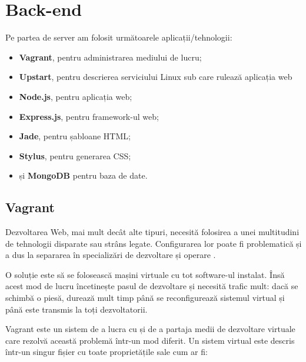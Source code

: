 \documentclass[a4wide,12pt]{report}
\newcommand{\eng}[1]{{#1}} %
\newcommand{\acr}[1]{{\textsmaller[1]{\textsc{#1}}}} %
\begin{document}
\section{\eng{Back-end}}

Pe partea de server am folosit următoarele aplicații/tehnologii:

\begin{itemize}

\item \textbf{Vagrant}, pentru administrarea mediului de lucru;

\item \textbf{Upstart}, pentru descrierea serviciului Linux sub care rulează
aplicația web

\item \textbf{Node.js}, pentru aplicația web;

\item \textbf{Express.js}, pentru \eng{framework}-ul web;

\item \textbf{Jade}, pentru șabloane HTML;

\item \textbf{Stylus}, pentru generarea CSS;

\item și \textbf{MongoDB} pentru baza de date.

\end{itemize}

\subsection{Vagrant}
\label{vagrantsub}

Dezvoltarea Web, mai mult decât alte tipuri, necesită folosirea a unei
multitudini de tehnologii disparate sau strâns legate. Configurarea lor poate fi
problematică și a dus la separarea în specializări de dezvoltare și operare
\acr{IT}.

O soluție este să se folosească mașini virtuale cu tot \eng{software}-ul
instalat. Însă acest mod de lucru încetinește pasul de dezvoltare și necesită
trafic mult: dacă se schimbă o piesă, durează mult timp până se reconfigurează
sistemul virtual și până este transmis la toți dezvoltatorii.

Vagrant este un sistem de a lucra cu și de a partaja medii de dezvoltare
virtuale care rezolvă această problemă într-un mod diferit. Un sistem virtual
este descris într-un singur fișier cu toate proprietățile sale cum ar fi:
\end{document}
